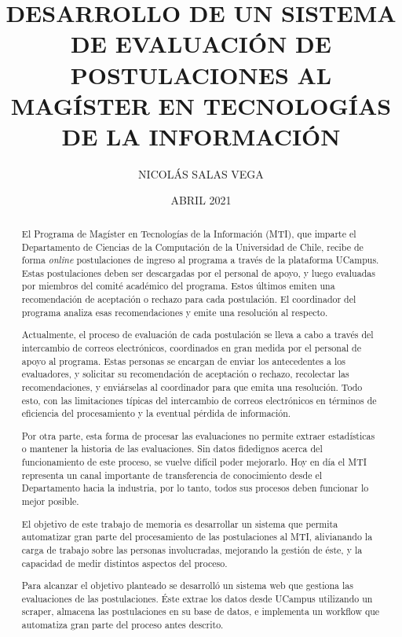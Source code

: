\documentclass[upright, contnum]{umemoria}
\author{NICOLÁS SALAS VEGA}
\title{DESARROLLO DE UN SISTEMA DE EVALUACIÓN DE POSTULACIONES AL MAGÍSTER EN TECNOLOGÍAS DE LA INFORMACIÓN}
\date{ABRIL 2021}
\begin{document}
\frontmatter
\maketitle

\begin{abstract}
    El Programa de Magíster en Tecnologías de la Información (MTI), que imparte
    el Departamento de Ciencias de la Computación de la Universidad de Chile,
    recibe de forma \emph{online} postulaciones de ingreso al programa a través
    de la plataforma UCampus. Estas postulaciones deben ser descargadas por el
    personal de apoyo, y luego evaluadas por miembros del comité académico del
    programa. Estos últimos emiten una recomendación de aceptación o rechazo
    para cada postulación. El coordinador del programa analiza esas
    recomendaciones y emite una resolución al respecto.

    Actualmente, el proceso de evaluación de cada postulación se lleva a cabo a
    través del intercambio de correos electrónicos, coordinados en gran medida
    por el personal de apoyo al programa. Estas personas se encargan de enviar
    los antecedentes a los evaluadores, y solicitar su recomendación de
    aceptación o rechazo, recolectar las recomendaciones, y enviárselas al
    coordinador para que emita una resolución. Todo esto, con las limitaciones
    típicas del intercambio de correos electrónicos en términos de eficiencia
    del procesamiento y la eventual pérdida de información.
    
    Por otra parte, esta forma de procesar las evaluaciones no permite extraer
    estadísticas o mantener la historia de las evaluaciones. Sin datos
    fidedignos acerca del funcionamiento de este proceso, se vuelve difícil
    poder mejorarlo. Hoy en día el MTI representa un canal importante de
    transferencia de conocimiento desde el Departamento hacia la industria, por
    lo tanto, todos sus procesos deben funcionar lo mejor posible.
    
    El objetivo de este trabajo de memoria es desarrollar un sistema que permita
    automatizar gran parte del procesamiento de las postulaciones al MTI,
    alivianando la carga de trabajo sobre las personas involucradas, mejorando
    la gestión de éste, y la capacidad de medir distintos aspectos del proceso.
    
    Para alcanzar el objetivo planteado se desarrolló un sistema web que
    gestiona las evaluaciones de las postulaciones. Éste extrae los datos desde
    UCampus utilizando un scraper, almacena las postulaciones en su base de
    datos, e implementa un workflow que automatiza gran parte del proceso antes
    descrito.
    

\end{abstract}
\end{document}
